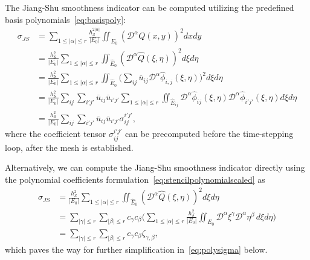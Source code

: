 The Jiang-Shu smoothness indicator can be computed utilizing the predefined basis polynomials~\eqref{eq:basispoly}:
\begin{equation}\label{eq:JSsmoothnessIC}
\begin{aligned}
		  \sigma_{JS} &= \sum_{1\leq \lvert \alpha \rvert \leq r}  \frac{h_\mathcal{S}^{2\lvert\alpha\rvert}}{\lvert E_0 \rvert} 
		  \iint_{E_0} (\mathcal{D}^\alpha Q(x,y))^2 dx dy\\
					  &= \frac{h_\mathcal{S}^2}{\lvert E_0 \rvert}\sum_{1\leq \lvert \alpha \rvert \leq r} \iint_{\hat{E}_0} (\mathcal{D}^\alpha\hat{Q}(\xi, \eta))^2 d\xi d\eta \\
					  &= \frac{h_\mathcal{S}^2}{\lvert E_0 \rvert}\sum_{1\leq \lvert \alpha \rvert \leq r} \iint_{\hat{E}_0} \big( \sum_{ij} \overline{u}_{ij} \mathcal{D}^\alpha \hat{\phi}_{i,j}(\xi, \eta) \big)^2 d\xi d\eta \\
					  &= \frac{h_\mathcal{S}^2}{\lvert E_0 \rvert}\sum_{ij} \sum_{i'j'} \overline{u}_{ij} \overline{u}_{i'j'} \sum_{1\leq \lvert \alpha \rvert \leq r} 
					  \iint_{\hat{E}_{ij}} \mathcal{D}^\alpha \hat{\phi}_{ij}(\xi, \eta) 
					  \mathcal{D}^\alpha \hat{\phi}_{i'j'}(\xi, \eta) d\xi d\eta \\
					  &= \frac{h_\mathcal{S}^2}{\lvert E_0 \rvert}\sum_{ij} \sum_{i'j'} \overline{u}_{ij} \overline{u}_{i'j'} \sigma^{i'j'}_{ij},
\end{aligned}
\end{equation}
where the coefficient tensor $\sigma^{i'j'}_{ij}$ can be precomputed before the time-stepping loop, after the mesh is established.

Alternatively, we can compute the Jiang-Shu smoothness indicator directly using 
the polynomial coefficients formulation~\eqref{eq:stencilpolynomialscaled} as
\begin{equation}\label{eq:cofformulation}
		  \begin{aligned}
					  \sigma_{JS} &= \frac{h_\mathcal{S}^2}{\lvert E_0 \rvert}\sum_{1\leq \lvert \alpha \rvert \leq r} \iint_{\hat{E}_0} (\mathcal{D}^\alpha\hat{Q}(\xi, \eta))^2 d\xi d\eta \\
					 &= \sum_{\lvert \gamma \rvert \leq r} \sum_{\lvert \beta \rvert \leq r} c_\gamma c_\beta 
					 \bigg(\sum_{1\leq \lvert \alpha \rvert \leq r}\frac{h^2_\mathcal{S}}{\lvert E_0 \rvert} \iint_{E_0} 
					 \mathcal{D}^\alpha \xi^\gamma \mathcal{D}^\alpha \eta^\beta \, d\xi d\eta \bigg)\\
					 &= \sum_{\lvert \gamma \rvert \leq r} \sum_{\lvert \beta \rvert \leq r} c_\gamma c_\beta \zeta_{\gamma, \beta},
		  \end{aligned}
\end{equation}
which paves the way for further simplification in~\eqref{eq:polysigma} below.

